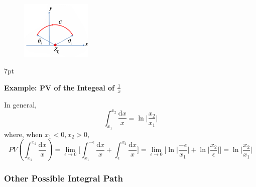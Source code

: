 \documentclass[10pt]{article}
\newcommand{\dd}{\mathrm{d}}
\newenvironment{formal}[2]{%
	\def\FrameCommand{%
		\hspace{1pt}%
		{\color{#1}\vrule width 2pt}%
		{\color{#2}\vrule width 4pt}%
		\colorbox{#2}%
	}%
	\MakeFramed{\advance\hsize-\width\FrameRestore}%
	\noindent\hspace{-4.55pt}%
	\begin{adjustwidth}{}{7pt}%
		\vspace{2pt}\vspace{2pt}%
	}
	{%
		\vspace{2pt}\end{adjustwidth}\endMakeFramed%
}
\begin{document}
\begin{figure}
	\centering
	\includegraphics[width=0.3\textwidth]{img3-5}
\end{figure}

\begin{formal}{Brown}{brownshade}
	
	\textbf{Example: PV of the Integeal of $\frac{1}{x}$}

	\noindent In general,
	$$
	\int_{x_1}^{x_2} \frac{\dd x}{x} = \ln \bigg| \frac{x_2}{x_1} \bigg|
	$$
	where, when $x_1 < 0, x_2 > 0$,
	$$
	PV(\int_{x_1}^{x_2} \frac{\dd x}{x}) = \lim_{\epsilon\to 0} \bigg[ \int_{x_1}^{-\epsilon} \frac{\dd x}{x} + \int_{\epsilon}^{x_2} \frac{\dd x}{x} \bigg] = \lim_{\epsilon\to 0} \bigg[ \ln \bigg| \frac{-\epsilon}{x_1} \bigg| + \ln \bigg| \frac{x_2}{\epsilon} \bigg| \bigg] = \ln \bigg| \frac{x_2}{x_1} \bigg|
	$$

\end{formal}

\subsubsection{Other Possible Integral Path}
\end{document}

